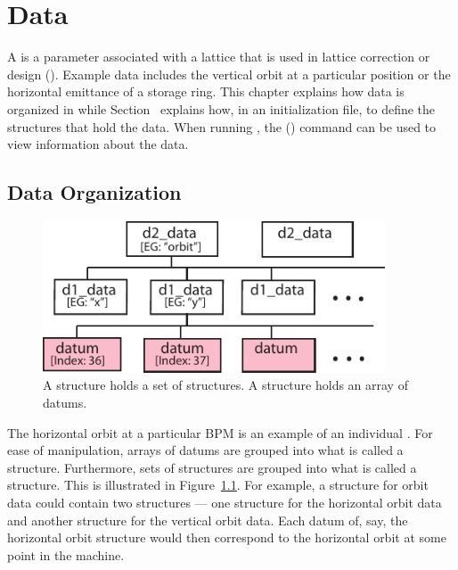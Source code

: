 \chapter{Data}
\label{c:data}

A \tao {} is a parameter associated with a lattice that is used in lattice correction or
design (). Example data includes the vertical orbit at a particular position or the
horizontal emittance of a storage ring. This chapter explains how data is organized in \tao while
Section~ explains how, in an initialization file, to define the structures that
hold the data.  When running \tao, the  () command can be used to view
information about the data.

\section{Data Organization}
\label{s:data.org}

\begin{figure}
  \centering
  \includegraphics[width=4in]{data-tree.pdf}
  \caption[Data tree structure]
{A  structure holds a set of  structures. 
A  structure holds an array of datums.}
  \label{f:data.tree}
\end{figure}

The horizontal orbit at a particular BPM is an example of an individual . For ease of
manipulation, arrays of datums are grouped into what is called a 
structure. Furthermore, sets of  structures are grouped into what is called a
 structure.  This is illustrated in Figure~\ref{f:data.tree}.  For example, a
 structure for orbit data could contain two  structures --- one 
structure for the horizontal orbit data and another  structure for the vertical orbit
data. Each datum of, say, the horizontal orbit  structure would then correspond to the
horizontal orbit at some point in the machine. 

